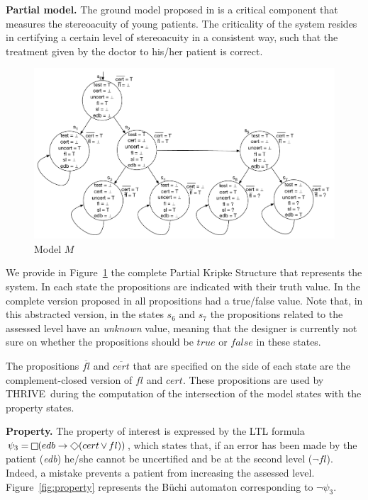 \documentclass[runningheads,a4paper]{llncs}
\newcommand{\NAME}{THRIVE}
\begin{document}
\vskip 0.05in  
\textbf{Partial model.} The ground model proposed in \cite{arcaini2015formal} is a critical component that measures the stereoacuity of young patients. The criticality of the system resides in certifying a certain level of stereoacuity in a consistent way, such that the treatment given by the doctor to his/her patient is correct. 

\begin{figure}[h!]
\begin{center}         
 	\includegraphics[width=\linewidth]{./FiguresProof/Fig1.pdf}
\end{center}
\caption{Model $M$}  
\label{fig:model}
\end{figure}

We provide in Figure~\ref{fig:model} the complete Partial Kripke Structure that represents the system. 
In each state the propositions are indicated with their truth value.
In the complete version proposed in \cite{arcaini2015formal} all propositions had a true/false value. Note that, in this abstracted version, in the states $s_6$ and $s_7$ the propositions related to the assessed level have an \textit{unknown} value, meaning that the designer is currently not sure on whether the propositions should be $true$ or $false$ in these states.

The propositions $\overline{fl}$ and $\overline{cert}$ that are specified on the side of each state are the complement-closed version of $fl$ and $cert$. These propositions  are used by \NAME\ during the computation of the intersection of the model states with the property states.

\vskip 0.05in  
\textbf{Property.} The property of interest is expressed by the LTL formula $\psi_3=\LTLglobally(edb \rightarrow \LTLfinally (cert \LTLor fl))$, which states that, if an error has been made by the patient (\emph{edb}) he/she cannot be uncertified and be at the second level ($\neg fl$). Indeed, a mistake prevents a patient from increasing the assessed level.
Figure~\ref{fig:property} represents the B{\"u}chi automaton corresponding to $\lnot \psi_3$.
\end{document}
